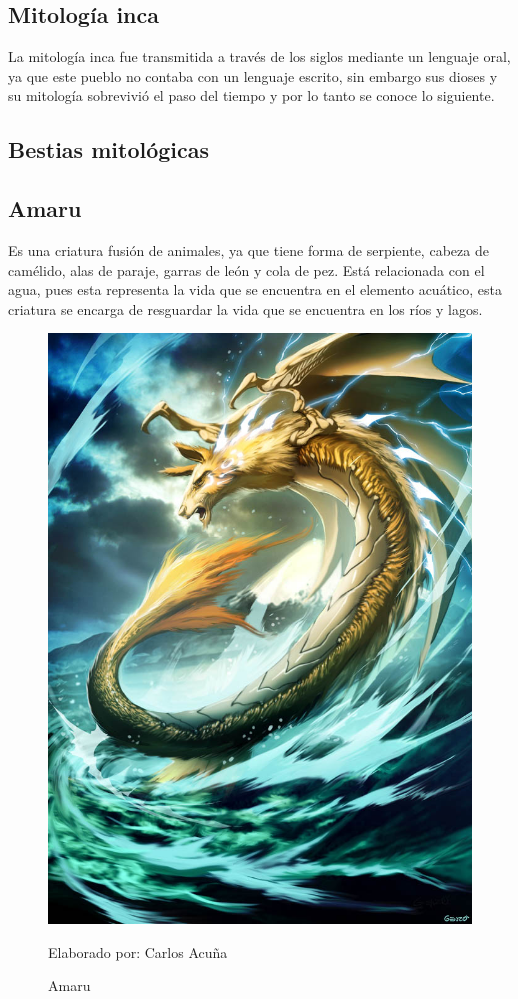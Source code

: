 \documentclass[a4paper, openright, 12pt]{report}
\begin{document}
\clearpage
\subsection*{Mitología inca}
\justify
La mitología inca fue transmitida a través de los siglos mediante un lenguaje oral, ya que este pueblo no contaba con un lenguaje escrito, sin embargo sus dioses y su mitología sobrevivió el paso del tiempo y por lo tanto se conoce lo siguiente.

\subsection*{Bestias mitológicas}
\subsection*{Amaru}
\justify
Es una criatura fusión de animales, ya que tiene forma de serpiente, cabeza de camélido, alas de paraje, garras de león y cola de pez. Está relacionada con el agua, pues esta representa la vida que se encuentra en el elemento acuático, esta criatura se encarga de resguardar la vida que se encuentra en los ríos y lagos. \cite{morel1987diccionario} 

\begin{figure}[h]
\captionsetup{justification=centering,margin=2cm}
\includegraphics[scale=0.3]{h11}
\centering
\caption{Amaru}
Elaborado por: Carlos Acuña
\label{fig:h11}
\end{figure}
\end{document}
